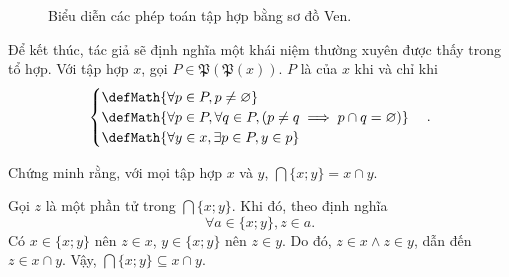 \begin{figure}[H]
   \caption{Biểu diễn các phép toán tập hợp bằng sơ đồ Ven.}
   \label{fig:li_thuyet_tap_hop:tien_de:tien_de_tach:ven_phep_tinh}
\end{figure}

Để kết thúc, tác giả sẽ định nghĩa một khái niệm thường xuyên được thấy trong tổ hợp. Với tập hợp $x$, gọi $P \in \mathfrak{P}\left(\mathfrak{P}(x)\right)$. $P$ là  của $x$ khi và chỉ khi 
\begin{equation*}
   \begin{cases}
      \defMath{\forall p \in P, p \neq \varnothing} \\
      \defMath{\forall p \in P, \forall q \in P, (p \neq q \implies p \cap q = \varnothing)} \\
      \defMath{\forall y \in x, \exists p \in P, y \in p}
   \end{cases}.
\end{equation*}

\exercise Chứng minh rằng, với mọi tập hợp $x$ và $y$, $\bigcap \{x; y\} = x \cap y$.

\solution 

Gọi $z$ là một phần tử trong $\bigcap \{x; y\}$. Khi đó, theo định nghĩa $$\forall a \in \{x; y\}, z \in a.$$
Có $x \in \{x; y\}$ nên $z \in x$, $y \in \{x; y\}$ nên $z \in y$. Do đó, $z \in x \land z \in y$, dẫn đến $z \in x \cap y$. Vậy, $\bigcap \{x; y\} \subseteq x \cap y$.

